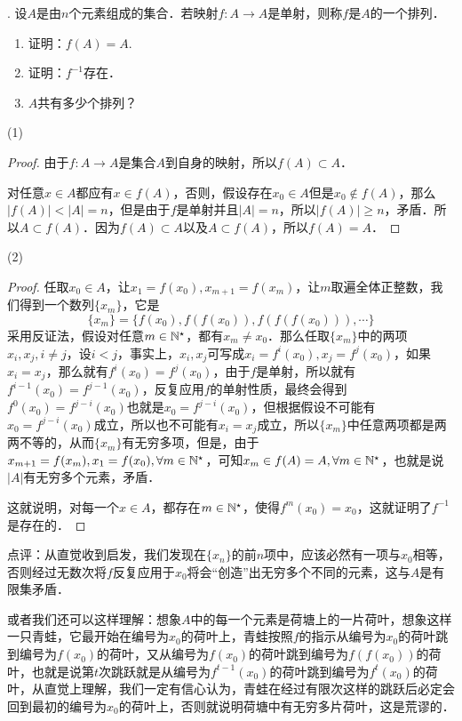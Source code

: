 . 设$A$是由$n$个元素组成的集合．若映射$f: A \to A$是单射，则称$f$是$A$的一个排列．
\begin{enumerate}
    \item 证明：$f(A) = A$. 
    \item 证明：$f^{-1}$存在．
    \item $A$共有多少个排列？
\end{enumerate}

\noindent (1)
\begin{proof}
由于$f: A \to A$是集合$A$到自身的映射，所以$f(A) \subset A$．

\noindent 对任意$x \in A$都应有$x \in f(A)$，否则，假设存在$x_0 \in A$但是$x_0 \not\in f(A)$，那么$| f(A) | < |A| = n$，但是由于$f$是单射并且$|A| = n$，所以$|f(A)| \geq n$，矛盾．所以$A \subset f(A)$．因为$f(A) \subset A$以及$A \subset f(A)$，所以$f(A) = A$．
\end{proof}

\noindent (2)
\begin{proof}
任取$x_0 \in A$，让$x_{1} = f(x_0), x_{m+1} = f(x_m)$，让$m$取遍全体正整数，我们得到一个数列$\{ x_m \}$，它是
\begin{equation}
    \{ x_m \} = \{ f(x_0), f(f(x_0)), f(f(f(x_0))), \cdots \}
\end{equation}
采用反证法，假设对任意$m \in \mathbb{N}^\star$，都有$x_m \neq x_0$．那么任取$\{ x_m \}$中的两项$x_i, x_j, i \neq j$，设$ i < j$，事实上，$x_i, x_j$可写成$x_i = f^{i}(x_0), x_j = f^j (x_0)$，如果$x_i = x_j$，那么就有$f^{i}(x_0) = f^{j}(x_0)$，由于$f$是单射，所以就有$f^{i-1}(x_0) = f^{j-1}(x_0)$，反复应用$f$的单射性质，最终会得到$f^{0}(x_0) = f^{j-i}(x_0)$也就是$x_0 = f^{j-i}(x_0)$，但根据假设不可能有$x_0 = f^{j-i}(x_0)$成立，所以也不可能有$x_i = x_j$成立，所以$\{ x_m \}$中任意两项都是两两不等的，从而$\{ x_m \}$有无穷多项，但是，由于$x_{m+1} = f(x_m), x_1 = f(x_0), \forall m \in \mathbb{N}^\star$，可知$x_m \in f(A) = A, \forall m \in \mathbb{N}^\star$，也就是说$|A|$有无穷多个元素，矛盾．

\noindent 这就说明，对每一个$x \in A$，都存在$m \in \mathbb{N}^\star$，使得$f^m (x_0) = x_0$，这就证明了$f^{-1}$是存在的．
\end{proof}

\noindent 点评：从直觉收到启发，我们发现在$\{ x_n \}$的前$n$项中，应该必然有一项与$x_0$相等，否则经过无数次将$f$反复应用于$x_0$将会``创造''出无穷多个不同的元素，这与$A$是有限集矛盾．

\noindent 或者我们还可以这样理解：想象$A$中的每一个元素是荷塘上的一片荷叶，想象这样一只青蛙，它最开始在编号为$x_0$的荷叶上，青蛙按照$f$的指示从编号为$x_0$的荷叶跳到编号为$f(x_0)$的荷叶，又从编号为$f(x_0)$的荷叶跳到编号为$f(f(x_0))$的荷叶，也就是说第$t$次跳跃就是从编号为$f^{t-1}(x_0)$的荷叶跳到编号为$f^{t}(x_0)$的荷叶，从直觉上理解，我们一定有信心认为，青蛙在经过有限次这样的跳跃后必定会回到最初的编号为$x_0$的荷叶上，否则就说明荷塘中有无穷多片荷叶，这是荒谬的．

